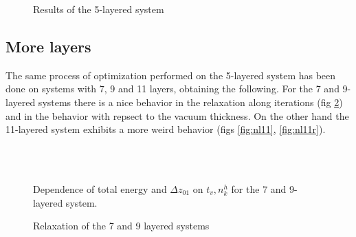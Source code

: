 \documentclass[a4paper, 11pt]{article}
\begin{document}
    \begin{figure}[H]
      \centering
      \begin{subfigure}[Behavior of total energy and $\Delta z_{01}$ with respect to $t_v$ with 10 horizontal n k points.]{
        \label{fig:nl5_nk10}}
      \end{subfigure}
      \begin{subfigure}[Relaxation of the layers during the simulation. Solid line with $t_v = 18 \si{.a.u}, n_k^h = 10$; dashed line with $t_v = 25 \si{.a.u}, n_k^h = 12$]{
        \label{fig:nl5_relaxation}}
      \end{subfigure}
      \caption{Results of the 5-layered system}
    \end{figure}

  \subsection{More layers}
    The same process of optimization performed on the 5-layered system has been done on systems with 7, 9 and 11 layers, obtaining the following.
    For the 7 and 9-layered systems there is a nice behavior in the relaxation along iterations (fig \ref{fig:nl7-9r}) and in the behavior with repsect to the vacuum thickness. On the other hand the 11-layered system exhibits a more weird behavior (figs \ref{fig:nl11}, \ref{fig:nl11r}).

    \begin{figure}
      \centering
      \\
      \\
      \caption{Dependence of total energy and $\Delta z_{01}$ on $t_v, n_k^h$ for the 7 and 9-layered system.}
      \label{fig:nl7-9}
    \end{figure}

    \begin{figure}
      \centering
      \caption{Relaxation of the 7 and 9 layered systems}
      \label{fig:nl7-9r}
    \end{figure}
\end{document}
